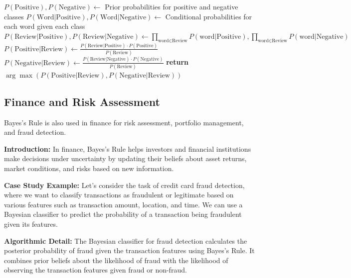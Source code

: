 \documentclass[12pt]{book} %
\begin{document}
\FloatBarrier
\begin{algorithm}
\caption{Naive Bayes Classifier for Sentiment Analysis}\label{sentiment_analysis}
\begin{algorithmic}[1]
\State $P(\text{Positive}), P(\text{Negative}) \gets$ Prior probabilities for positive and negative classes
\State $P(\text{Word} | \text{Positive}), P(\text{Word} | \text{Negative}) \gets$ Conditional probabilities for each word given each class
\State $P(\text{Review} | \text{Positive}), P(\text{Review} | \text{Negative}) \gets \prod_{\text{word} \in \text{Review}} P(\text{word} | \text{Positive}), \prod_{\text{word} \in \text{Review}} P(\text{word} | \text{Negative})$
\State $P(\text{Positive} | \text{Review}) \gets \frac{P(\text{Review} | \text{Positive}) \cdot P(\text{Positive})}{P(\text{Review})}$
\State $P(\text{Negative} | \text{Review}) \gets \frac{P(\text{Review} | \text{Negative}) \cdot P(\text{Negative})}{P(\text{Review})}$
\State \textbf{return} $\arg\max(P(\text{Positive} | \text{Review}), P(\text{Negative} | \text{Review}))$ 
\EndProcedure
\end{algorithmic}
\end{algorithm}
\FloatBarrier

\subsection{Finance and Risk Assessment}

Bayes's Rule is also used in finance for risk assessment, portfolio management, and fraud detection.

\textbf{Introduction:} In finance, Bayes's Rule helps investors and financial institutions make decisions under uncertainty by updating their beliefs about asset returns, market conditions, and risks based on new information.

\textbf{Case Study Example:} Let's consider the task of credit card fraud detection, where we want to classify transactions as fraudulent or legitimate based on various features such as transaction amount, location, and time. We can use a Bayesian classifier to predict the probability of a transaction being fraudulent given its features.

\textbf{Algorithmic Detail:}
The Bayesian classifier for fraud detection calculates the posterior probability of fraud given the transaction features using Bayes's Rule. It combines prior beliefs about the likelihood of fraud with the likelihood of observing the transaction features given fraud or non-fraud.
\end{document}
